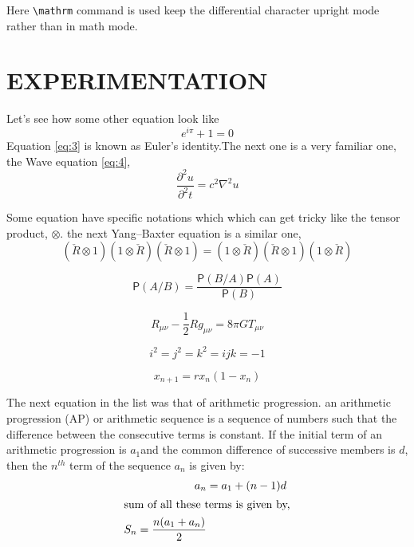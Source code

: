 \documentclass[12pt,a4paper]{report}
\newcommand*{\prob}{\mathsf{P}}
\begin{document}
Here \lstinline[language={[LaTeX]TeX},basicstyle=\ttfamily]{\mathrm} command is used keep the differential character upright mode rather than in math mode.

\chapter{\MakeUppercase{Experimentation}}
\lipsum[1]
Let's see how some other equation look like 
\begin{equation}  \label{eq:3}
e^{i\pi} + 1 = 0
\end{equation}
Equation \ref{eq:3} is known as Euler's identity.The next one is a very familiar one, the Wave equation \ref{eq:4},
\begin{equation}  \label{eq:4}
\frac{\partial^2{u}}{\partial^2{t}} = c^2 \nabla^2 u
\end{equation}

Some equation have specific notations which which can get tricky like the tensor product, $\otimes$. the next Yang–Baxter equation is a similar one,
\begin{equation}  \label{eq:5}
(\check{R}\otimes1)(1\otimes\check{R})(\check{R}\otimes1) = (1\otimes\check{R})(\check{R}\otimes1)(1\otimes\check{R})
\end{equation}

\begin{equation}
\prob(A/B) = \frac{\prob (B/A)  \prob (A)}{\prob (B)}
\end{equation}

\begin{equation}
R_{\mu\nu} - \frac{1}{2}Rg_{\mu\nu} = 8\pi G T_{\mu\nu}
\end{equation}

\begin{equation}
i^{2} = j^{2} = k^{2} = ijk = -1
\end{equation}

\begin{equation}
x_{n+1} = rx_{n}(1-x_{n})
\end{equation}

The next equation in the list was that of arithmetic  progression. an arithmetic progression (AP) or arithmetic sequence is a sequence of numbers such that the difference between the consecutive terms is constant. If the initial term of an arithmetic progression is $a_{1}$and the common difference of successive members is $d$, then the $n^{th}$ term of the sequence $a_{n}$ is given by:
\begin{subequations}
    \begin{align}   
       a_{n} &= a_{1} + (n-1)d \label{apexp1}\\
       \intertext{sum of all these terms is given by,}
       S_{n} = \frac{n(a_{1}+a_{n})}{2} \label{apexp2}        
    \end{align}
\end{subequations}
\end{document}
